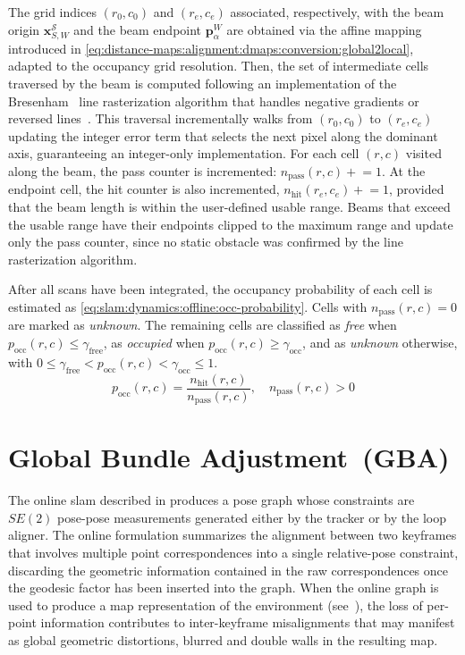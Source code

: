 The grid indices $(r_0,c_0)$ and $(r_e,c_e)$ associated, respectively,
with the beam origin $\mathbf{x}_{S,W}^{\mathcal{S}}$ and the beam endpoint
$\mathbf{p}_\alpha^{W}$ are obtained via the affine mapping introduced
in \eqref{eq:distance-maps:alignment:dmaps:conversion:global2local},
adapted to the occupancy grid resolution. Then, the set of intermediate cells
traversed by the beam is computed following an implementation of the
Bresenham~\cite{bresenham:ibm:1965} line rasterization algorithm that handles
negative gradients or reversed lines~\cite{zingl:uas:2016}.
This traversal incrementally walks from $(r_0,c_0)$ to $(r_e,c_e)$ updating
the integer error term that selects the next pixel along the
dominant axis, guaranteeing an integer-only implementation.
For each cell $(r,c)$ visited along the beam, the pass counter is incremented:
$n_{\mathrm{pass}}(r,c) \mathrel{+}= 1$. At the endpoint cell, the
hit counter is also incremented,
$n_{\mathrm{hit}}(r_e,c_e) \mathrel{+}= 1$, provided that the beam
length is within the user-defined usable range. Beams that exceed
the usable range have their endpoints clipped to the maximum range and
update only the pass counter, since no static obstacle was confirmed by
the line rasterization algorithm.

After all scans have been integrated, the occupancy
probability of each cell is estimated as
\eqref{eq:slam:dynamics:offline:occ-probability}.
Cells with $n_{\mathrm{pass}}(r,c) = 0$ are marked as \emph{unknown}.
The remaining cells are classified as \emph{free} when
$p_{\mathrm{occ}}(r,c) \leq \gamma_{\mathrm{free}}$, as \emph{occupied}
when $p_{\mathrm{occ}}(r,c) \geq \gamma_{\mathrm{occ}}$, and as
\emph{unknown} otherwise, with
$0 \leq \gamma_{\mathrm{free}} < p_{\mathrm{occ}}(r,c) < \gamma_{\mathrm{occ}} \leq 1$.
\begin{equation}
\label{eq:slam:dynamics:offline:occ-probability}
p_{\mathrm{occ}}(r,c) =
\frac{n_{\mathrm{hit}}(r,c)}{n_{\mathrm{pass}}(r,c)},
\quad n_{\mathrm{pass}}(r,c) > 0
\end{equation}

\section{Global Bundle Adjustment~(GBA)}\label{sec:slam:gba}

The online \gls{slam} described in  produces
a pose graph whose constraints are $SE(2)$ pose-pose measurements
generated either by the tracker or by the loop aligner. The online formulation
summarizes the alignment between two keyframes that involves multiple point
correspondences into a single relative-pose constraint, discarding the geometric
information contained in the raw correspondences once the geodesic factor has
been inserted into the graph. When the online graph is used to produce
a map representation of the environment
(see~), the loss of per-point information
contributes to inter-keyframe misalignments that may manifest as
global geometric distortions, blurred and double walls in the resulting map.

